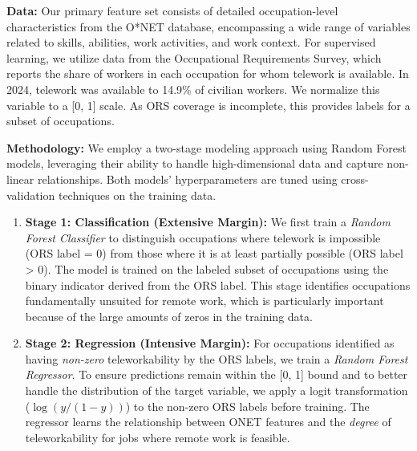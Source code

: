 \documentclass[
  11pt,
  letterpaper,
  DIV=11,
  numbers=noendperiod]{scrartcl}
\theoremstyle{plain}
\theoremstyle{remark}
\begin{document}
\textbf{Data:} Our primary feature set consists of detailed
occupation-level characteristics from the O*NET database, encompassing a
wide range of variables related to skills, abilities, work activities,
and work context. For supervised learning, we utilize data from the
Occupational Requirements Survey, which reports the share of workers in
each occupation for whom telework is available. In 2024, telework was
available to 14.9\% of civilian workers. We normalize this variable to a
{[}0, 1{]} scale. As ORS coverage is incomplete, this provides labels
for a subset of occupations.

\textbf{Methodology:} We employ a two-stage modeling approach using
Random Forest models, leveraging their ability to handle
high-dimensional data and capture non-linear relationships. Both models'
hyperparameters are tuned using cross-validation techniques on the
training data.

\begin{enumerate}
\def\labelenumi{\arabic{enumi}.}
\item
  \textbf{Stage 1: Classification (Extensive Margin):} We first train a
  \emph{Random Forest Classifier} to distinguish occupations where
  telework is impossible (ORS label = 0) from those where it is at least
  partially possible (ORS label \textgreater{} 0). The model is trained
  on the labeled subset of occupations using the binary indicator
  derived from the ORS label. This stage identifies occupations
  fundamentally unsuited for remote work, which is particularly
  important because of the large amounts of zeros in the training data.
\item
  \textbf{Stage 2: Regression (Intensive Margin):} For occupations
  identified as having \emph{non-zero} teleworkability by the ORS
  labels, we train a \emph{Random Forest Regressor}. To ensure
  predictions remain within the {[}0, 1{]} bound and to better handle
  the distribution of the target variable, we apply a logit
  transformation (\(\log(y / (1-y))\)) to the non-zero ORS labels before
  training. The regressor learns the relationship between ONET features
  and the \emph{degree} of teleworkability for jobs where remote work is
  feasible.
\end{enumerate}
\end{document}
